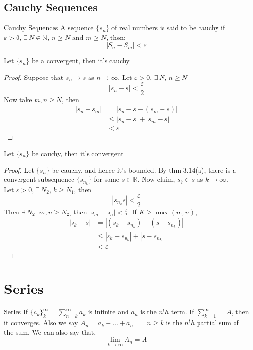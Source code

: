 \documentclass{article}
\newcommand{\R}{\mathbb{R}}
\newcommand{\N}{\mathbb{N}}
\newcommand{\e}{\varepsilon}
\newcommand{\ex}{\exists\,}
\begin{document}
\subsection{Cauchy Sequences}

\noindent\begin{definition}{Cauchy Sequences}{}
  A sequence $\{ s_n \}$ of real numbers is said to be cauchy if $\e > 0,\,\ex N\in\N$, $n\ge N$ and $m\ge N$, then:
  $$ |S_n - S_m| < \e $$
\end{definition}\vspace{10pt}

\noindent\begin{lemma}{}{}
  Let $\{ s_n \}$ be a convergent, then it's cauchy
\end{lemma}\vspace{10pt}
\begin{proof}
  Suppose that $s_n\to s$ as $n\to\infty$. Let $\e > 0,\,\ex N, \, n\ge N$
  $$ |s_n - s|< \frac{\e}{2} $$
  Now take $m, n \ge N$, then
  \begin{align*}
    |s_n - s_m| &= |s_n - s - (s_m - s)| \\
    &\le |s_n - s| + |s_m - s| \\
    &< \e
  \end{align*}
\end{proof}

\noindent\begin{lemma}{}{}
  Let $\{ s_n \}$ be cauchy, then it's convergent
\end{lemma}\vspace{10pt}
\begin{proof}
  Let $\{ s_n \}$ be cauchy, and hence it's bounded. By thm 3.14(a), there is a convergent subsequence $\{ s_{n_k} \}$ for some $s\in\R$. Now claim, $\displaystyle{s_k \in s}$ as $\displaystyle{k \to \infty}$.\\

  Let $\e > 0,\, \ex N_2$, $k \ge N_1$, then
  $$ |s_{n_k} s| < \frac{\e}{2} $$
  Then $\ex N_2, \, m, n \ge N_2$, then $|s_m - s_n| < \frac{\e}{2}$. If $K \ge \max(m, n)$,
  \begin{align*}
    |s_k - s| &= |(s_k - s_{n_k}) - (s - s_{n_k})|\\
    &\le |s_k - s_{n_k}| + |s - s_{n_k}|\\
    &< \e
  \end{align*}
\end{proof}

\section{Series}
\noindent\begin{definition}{Series}{}
   If $\displaystyle{\{ a_k \}^\infty_k = \sum_{n = k}^\infty a_k}$ is infinite and $a_n$ is the $n^th$ term. If $\displaystyle{\sum_{k=1}^\infty} = A$, then it converges. Also we say $\displaystyle{A_n = a_k + \dots + a_n \qquad n \ge k}$ is the $n^th$ partial sum of the sum. We can also say that,
   $$ \lim_{k\to\infty}{A_n} = A $$
\end{definition}\vspace{10pt}
\end{document}
